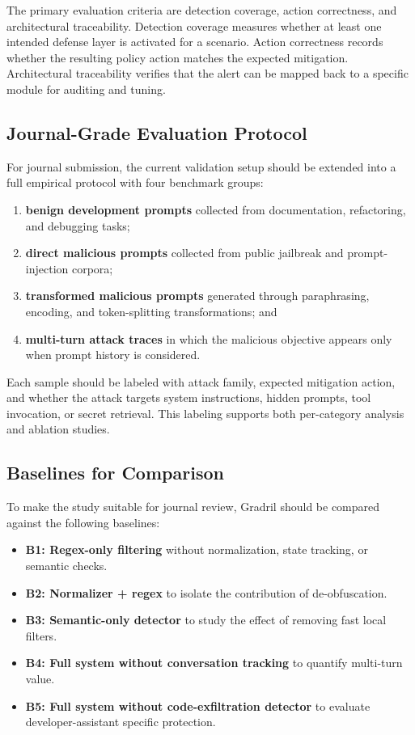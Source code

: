\documentclass[journal]{IEEEtran}
\begin{document}
The primary evaluation criteria are detection coverage, action correctness, and architectural traceability. Detection coverage measures whether at least one intended defense layer is activated for a scenario. Action correctness records whether the resulting policy action matches the expected mitigation. Architectural traceability verifies that the alert can be mapped back to a specific module for auditing and tuning.

\subsection{Journal-Grade Evaluation Protocol}
For journal submission, the current validation setup should be extended into a full empirical protocol with four benchmark groups:
\begin{enumerate}
    \item \textbf{benign development prompts} collected from documentation, refactoring, and debugging tasks;
    \item \textbf{direct malicious prompts} collected from public jailbreak and prompt-injection corpora;
    \item \textbf{transformed malicious prompts} generated through paraphrasing, encoding, and token-splitting transformations; and
    \item \textbf{multi-turn attack traces} in which the malicious objective appears only when prompt history is considered.
\end{enumerate}

Each sample should be labeled with attack family, expected mitigation action, and whether the attack targets system instructions, hidden prompts, tool invocation, or secret retrieval. This labeling supports both per-category analysis and ablation studies.

\subsection{Baselines for Comparison}
To make the study suitable for journal review, Gradril should be compared against the following baselines:
\begin{itemize}
    \item \textbf{B1: Regex-only filtering} without normalization, state tracking, or semantic checks.
    \item \textbf{B2: Normalizer + regex} to isolate the contribution of de-obfuscation.
    \item \textbf{B3: Semantic-only detector} to study the effect of removing fast local filters.
    \item \textbf{B4: Full system without conversation tracking} to quantify multi-turn value.
    \item \textbf{B5: Full system without code-exfiltration detector} to evaluate developer-assistant specific protection.
\end{itemize}
\end{document}
